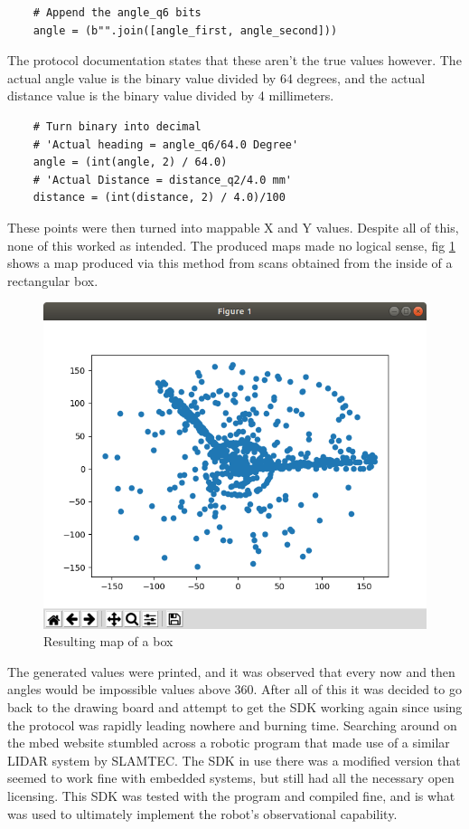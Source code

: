 	\begin{lstlisting}
	# Append the angle_q6 bits
	angle = (b"".join([angle_first, angle_second]))
	\end{lstlisting}
	
	The protocol documentation states that these aren't the true values however. The actual angle value is the binary value divided by 64 degrees, and the actual distance value is the binary value divided by 4 millimeters.
	
	\begin{lstlisting}
	# Turn binary into decimal
	# 'Actual heading = angle_q6/64.0 Degree'
	angle = (int(angle, 2) / 64.0)
	# 'Actual Distance = distance_q2/4.0 mm'
	distance = (int(distance, 2) / 4.0)/100
	\end{lstlisting}
	These points were then turned into mappable X and Y values. Despite all of this, none of this worked as intended. The produced maps made no logical sense, fig \ref{fig:failedmap} shows a map produced via this method from scans obtained from the inside of a rectangular box.
	\begin{figure}[ht]
		\centering
		\includegraphics[width=.6\linewidth]{SYNTHESIS/failedmap.png}
		\caption{Resulting map of a box}
		\label{fig:failedmap}
	\end{figure}
	
	The generated values were printed, and it was observed that every now and then angles would be impossible values above 360. After all of this it was decided to go back to the drawing board and attempt to get the SDK working again since using the protocol was rapidly leading nowhere and burning time. Searching around on the mbed website stumbled across a robotic program that made use of a similar LIDAR system by SLAMTEC. The SDK in use there was a modified version that seemed to work fine with embedded systems, but still had all the necessary open licensing. This SDK was tested with the program and compiled fine, and is what was used to ultimately implement the robot's observational capability.
	
